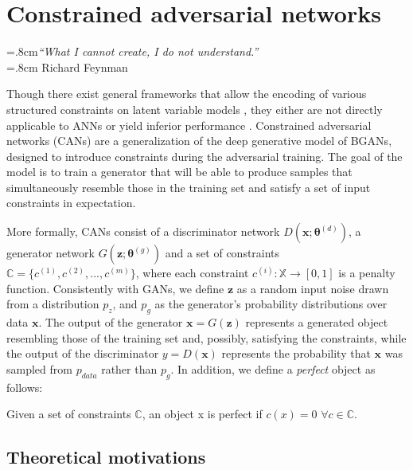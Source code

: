 \chapter{Constrained adversarial networks}
\label{ch:can}

\begin{flushright}
\rightskip=.8cm\textit{``What I cannot create, I do not understand.''} \\
\vspace{.2em}
\rightskip=.8cm Richard Feynman
\end{flushright}
\vspace{1em}


Though there exist general frameworks that allow the encoding of various structured constraints on latent variable models \cite{slvm_pr} \cite{bayesian_pr} \cite{exp_learn}, they either are not directly applicable to ANNs or yield inferior performance \cite{harnessing}.
Constrained adversarial networks (CANs) are a generalization of the deep generative model of BGANs, designed to introduce constraints during the adversarial training. The goal of the model is to train a generator that will be able to produce samples that simultaneously resemble those in the training set and satisfy a set of input constraints in expectation.

More formally, CANs consist of a discriminator network $D(\bm{x}; \bm{\theta}^{(d)})$, a generator network $G(\bm{z}; \bm{\theta}^{(g)})$ and a set of constraints $\mathbb{C} = \{c^{(1)}, c^{(2)}, ..., c^{(m)}\}$, where each constraint $c^{(i)}: \mathbb{X} \to [0, 1]$ is a penalty function. Consistently with GANs, we define $\bm{z}$ as a random input noise drawn from a distribution $p_z$, and $p_g$ as the generator's probability distributions over data $\bm{x}$. The output of the generator $\bm{x}=G(\bm{z})$ represents a generated object resembling those of the training set and, possibly, satisfying the constraints, while the output of the discriminator $y=D(\bm{x})$ represents the probability that $\bm{x}$ was sampled from $p_{data}$ rather than $p_g$. In addition, we define a \textit{perfect} object as follows:

\begin{Definition}
    Given a set of constraints $\mathbb{C}$, an object x is perfect if $c(x) = 0$ $\forall c \in \mathbb{C}$.
\end{Definition}


\section{Theoretical motivations}

